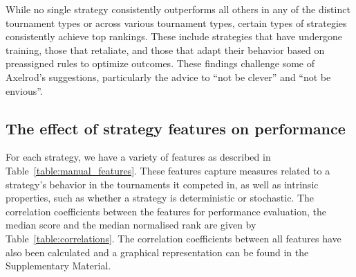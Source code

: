 \documentclass{article}
\begin{document}
While no single strategy consistently outperforms all others in any of the
distinct tournament types or across various tournament types, certain types of
strategies consistently achieve top rankings. These include strategies that have
undergone training, those that retaliate, and those that adapt their behavior
based on preassigned rules to optimize outcomes. These findings challenge some
of Axelrod's suggestions, particularly the advice to ``not be clever'' and ``not
be envious''.

\subsection{The effect of strategy features on performance}\label{section:evaluation_of_performance}

For each strategy, we have a variety of features as described in
Table~\ref{table:manual_features}. These features capture measures related to a
strategy's behavior in the tournaments it competed in, as well as intrinsic
properties, such as whether a strategy is deterministic or stochastic. The
correlation coefficients between the features for performance evaluation, the
median score and the median normalised rank are given by
Table~\ref{table:correlations}. The correlation coefficients between all
features have also been calculated and a graphical representation can be found
in the Supplementary Material.
\end{document}
